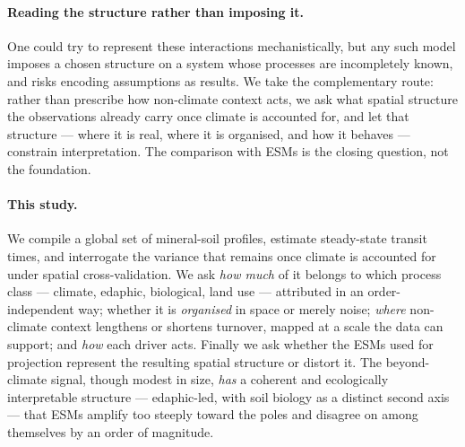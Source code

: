 \paragraph{Reading the structure rather than imposing it.}
One could try to represent these interactions mechanistically, but any such model
imposes a chosen structure on a system whose processes are incompletely known, and
risks encoding assumptions as results. We take the complementary route: rather
than prescribe how non-climate context acts, we ask what spatial structure the
observations already carry once climate is accounted for, and let that structure
--- where it is real, where it is organised, and how it behaves --- constrain
interpretation. The comparison with ESMs is the closing question, not the
foundation.

\paragraph{This study.}
We compile a global set of mineral-soil profiles, estimate steady-state transit
times, and interrogate the variance that remains once climate is accounted for
under spatial cross-validation. We ask \emph{how much} of it belongs to which
process class --- climate, edaphic, biological, land use --- attributed in an
order-independent way; whether it is \emph{organised} in space or merely noise;
\emph{where} non-climate context lengthens or shortens turnover, mapped at a scale
the data can support; and \emph{how} each driver acts. Finally we ask whether the
ESMs used for projection represent the resulting spatial structure or distort it.
The beyond-climate signal, though modest in size, \emph{has} a coherent and
ecologically interpretable structure --- edaphic-led, with soil biology as a
distinct second axis --- that ESMs amplify too steeply toward the poles and
disagree on among themselves by an order of magnitude.
